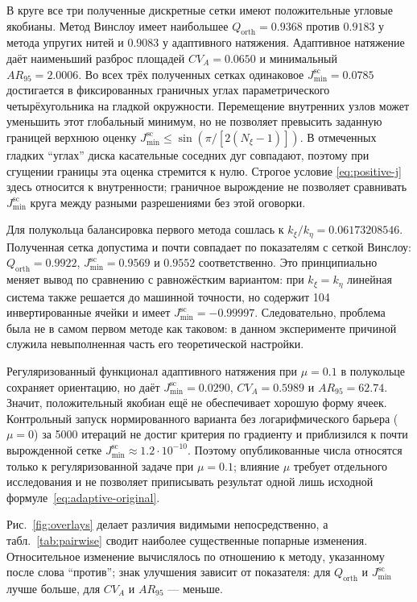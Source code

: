 \documentclass[11pt,a4paper]{article}
\newcommand{\Jsc}{J_{\min}^{\mathrm{sc}}}
\begin{document}
В круге все три полученные дискретные сетки имеют положительные угловые
якобианы. Метод Винслоу имеет наибольшее
\(Q_{\mathrm{orth}}=0.9368\) против \(0.9183\) у метода упругих нитей
и \(0.9083\) у адаптивного натяжения. Адаптивное натяжение даёт
наименьший разброс площадей \(CV_A=0.0650\) и минимальный
\(AR_{95}=2.0006\). Во всех трёх полученных сетках одинаковое
\(\Jsc=0.0785\) достигается в фиксированных граничных углах
параметрического четырёхугольника на гладкой окружности. Перемещение
внутренних узлов может уменьшить этот глобальный минимум, но не
позволяет превысить заданную границей верхнюю оценку
\(\Jsc\le\sin(\pi/[2(N_\xi-1)])\). В отмеченных гладких ``углах'' диска
касательные соседних дуг совпадают, поэтому при сгущении границы эта
оценка стремится к нулю. Строгое условие
\eqref{eq:positive-j} здесь относится к внутренности; граничное
вырождение не позволяет сравнивать \(\Jsc\) круга между разными
разрешениями без этой оговорки.

Для полукольца балансировка первого метода сошлась к
\(k_\xi/k_\eta=0.06173208546\). Полученная сетка допустима и почти
совпадает по показателям с сеткой Винслоу:
\(Q_{\mathrm{orth}}=0.9922\), \(\Jsc=0.9569\) и \(0.9552\)
соответственно. Это принципиально меняет вывод по сравнению с
равножёстким вариантом: при \(k_\xi=k_\eta\) линейная система также
решается до машинной точности, но содержит 104 инвертированные ячейки и
имеет \(\Jsc=-0.99997\). Следовательно, проблема была не в самом первом
методе как таковом: в данном эксперименте причиной служила
невыполненная часть его теоретической настройки.

Регуляризованный функционал адаптивного натяжения при \(\mu=0.1\) в
полукольце сохраняет ориентацию, но даёт \(\Jsc=0.0290\),
\(CV_A=0.5989\) и \(AR_{95}=62.74\). Значит, положительный якобиан ещё
не обеспечивает хорошую форму ячеек. Контрольный запуск нормированного
варианта без логарифмического барьера (\(\mu=0\)) за 5000 итераций не
достиг критерия по градиенту и
приблизился к почти вырожденной сетке
\(\Jsc\approx1.2\cdot10^{-10}\). Поэтому опубликованные числа относятся
только к регуляризованной задаче при \(\mu=0.1\); влияние \(\mu\)
требует отдельного исследования и не позволяет приписывать результат
одной лишь исходной формуле~\eqref{eq:adaptive-original}.

Рис.~\ref{fig:overlays} делает различия видимыми непосредственно, а
табл.~\ref{tab:pairwise} сводит наиболее существенные попарные
изменения. Относительное изменение вычислялось по отношению к методу,
указанному после слова ``против''; знак улучшения зависит от показателя:
для \(Q_{\mathrm{orth}}\) и \(\Jsc\) лучше больше, для \(CV_A\) и
\(AR_{95}\) --- меньше.
\end{document}
